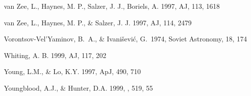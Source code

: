 \documentclass[12pt,preprint]{aastex}
\begin{document}
\begin{thebibliography}{}
van Zee, L., Haynes, M. P., Salzer, J. J., Boriels, A. 1997, AJ, 113, 1618

van Zee, L., Haynes, M. P., \& Salzer, J. J. 1997, AJ, 114, 2479

Vorontsov-Vel'Yaminov, B.~A., \& 
Ivani{\v s}evi{\'c}, G.\ 1974, Soviet Astronomy, 18, 174 

Whiting, A. B. 1999, AJ, 117, 202

Young, L.M., \& Lo, K.Y. 1997, ApJ, 490, 710
 
Youngblood, A.J., \& Hunter, D.A. 1999, \apj , 519, 55

\end{thebibliography}

\clearpage



\end{document}

